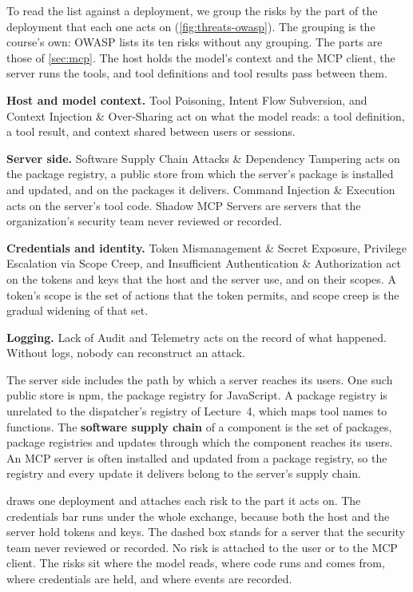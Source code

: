 To read the list against a deployment, we group the risks by the part of the deployment that each
one acts on (\cref{fig:threats-owasp}). The grouping is the course's own: OWASP lists its ten risks
without any grouping. The parts are those of \cref{sec:mcp}. The host holds the model's context and
the MCP client, the server runs the tools, and tool definitions and tool results pass between them.
\bi
\item \textbf{Host and model context.} Tool Poisoning, Intent Flow Subversion, and Context
Injection \& Over-Sharing act on what the model reads: a tool definition, a tool result, and
context shared between users or sessions.
\item \textbf{Server side.} Software Supply Chain Attacks \& Dependency Tampering acts on the
package registry, a public store from which the server's package is installed and updated, and on
the packages it delivers. Command Injection \& Execution acts on the server's tool code. Shadow MCP
Servers are servers that the organization's security team never reviewed or recorded.
\item \textbf{Credentials and identity.} Token Mismanagement \& Secret Exposure, Privilege
Escalation via Scope Creep, and Insufficient Authentication \& Authorization act on the tokens and
keys that the host and the server use, and on their scopes. A token's scope is the set of actions
that the token permits, and scope creep is the gradual widening of that set.
\item \textbf{Logging.} Lack of Audit and Telemetry acts on the record of what happened. Without
logs, nobody can reconstruct an attack.
\ei

The server side includes the path by which a server reaches its users. One such public store is npm,
the package registry for JavaScript. A package registry is unrelated to the dispatcher's
registry of Lecture~4, which maps tool names to functions. The \textbf{software supply chain} of a
component is the set of packages, package registries and updates through which the component
reaches its users. An MCP server is often installed and updated from a package registry, so the
registry and every update it delivers belong to the server's supply chain.

 draws one deployment and attaches each risk to the part it acts on. The
credentials bar runs under the whole exchange, because both the host and the server hold tokens and
keys. The dashed box stands for a server that the security team never reviewed or recorded. No
risk is attached
to the user or to the MCP client. The risks sit where the model reads, where code runs and comes
from, where credentials are held, and where events are recorded.

